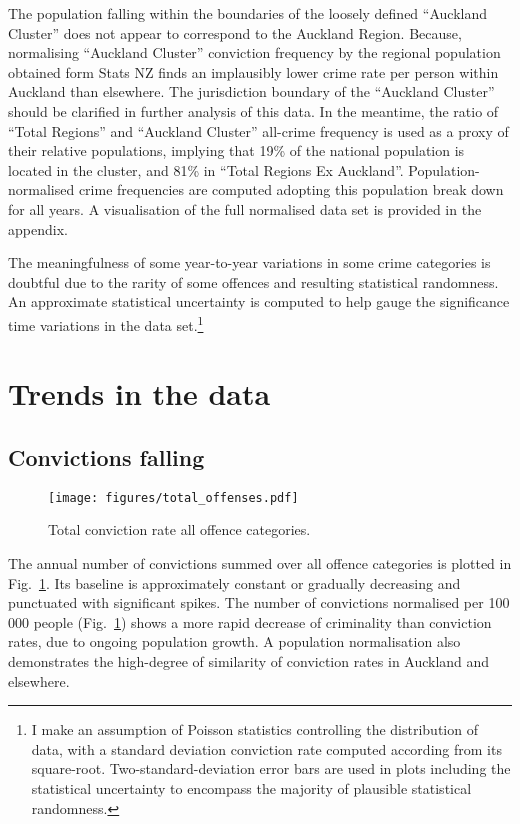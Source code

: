 \documentclass[onecolumn]{myarticle}
\begin{document}
The population falling within the boundaries of the loosely defined ``Auckland Cluster'' does not appear to correspond to the Auckland Region.
Because, normalising ``Auckland Cluster'' conviction frequency by the regional population obtained form Stats NZ finds an implausibly lower crime rate per person within Auckland than elsewhere.
The jurisdiction boundary of the ``Auckland Cluster'' should be clarified in further analysis of this data.
In the meantime, the ratio of ``Total Regions'' and ``Auckland Cluster'' all-crime frequency is used as a proxy of their relative populations, implying that 19\% of the national population is located in the cluster, and 81\% in ``Total Regions Ex Auckland''.
Population-normalised crime frequencies are computed adopting this population break down for all years.
A visualisation of the full normalised data set is provided in the appendix.

The meaningfulness of some year-to-year variations in some crime categories is doubtful due to the rarity of some offences and resulting statistical randomness.
An approximate statistical uncertainty is computed to help gauge the significance time variations in the data set.\footnote{I make an assumption of Poisson statistics controlling the distribution of data, with a standard deviation conviction rate computed according from its square-root.  
Two-standard-deviation error bars are used in plots including the statistical uncertainty to encompass the majority of plausible statistical randomness.}

\section*{Trends in the data}

\subsection*{Convictions falling}
\begin{figure}
  \centering
  \texttt{[image: figures/total\_offenses.pdf]}
  \caption{Total conviction rate all offence categories.}
  \label{fig:total crime}
\end{figure}

The annual number of convictions summed over all offence categories is plotted in Fig.~\ref{fig:total crime}.
Its baseline is approximately constant or gradually decreasing and punctuated with significant spikes.
The number of convictions normalised per 100$\,$000 people (Fig.~\ref{fig:total crime}) shows a more rapid decrease of criminality than conviction rates, due to ongoing population growth.
A population normalisation also demonstrates the high-degree of similarity of conviction rates in Auckland and elsewhere.
\end{document}
